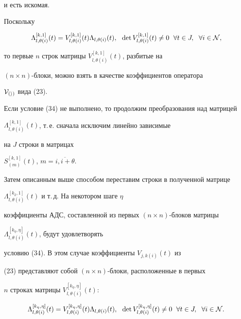 \begin{pf}
и есть искомая.





Поскольку


$$


\Lambda_{l,\theta(i)}^{[k,1]}(t)=V_{l,\theta (i)}^{[k,1]}(t)


\Lambda_{l,\theta(i)}(t), \ \ \det V_{l,\theta (i)}^{[k,1]}(t)


\ne 0 \ \; \forall t \in J, \ \; \forall i \in \cal N,


$$


то первые $n$ строк матрицы $V_{l,\theta (i)}^{[k,1]}(t)$, разбитые на


$(n \times n)$-блоки, можно взять в качестве коэффициентов оператора


$\cal V_{(i)}$ вида (23).





Если условие (34) не выполнено, то продолжим преобразования над матрицей


$\Lambda_{l,\theta(i)}^{[k,1]}(t)$, т.\,е. сначала исключим линейно зависимые


на $J$ строки в матрицах


$S_{(m)}^{[k,1]}(t)$, $m=\overline{i,i+\theta}$.


Затем описанным выше способом переставим строки в полученной матрице


$\Lambda_{l,\theta(i)}^{[k_2,1]}(t)$ и т.\,д. На некотором шаге $\eta$


коэффициенты АДС, составленной из первых $(n \times n)$-блоков матрицы


$\Lambda_{l,\theta(i)}^{[k_{\eta},\eta]}(t)$, будут удовлетворять


условию (34). В этом случае коэффициенты $V_{j,k(i)}(t)$ из 


(23) представляют собой $(n \times n)$-блоки, расположенные в первых 


$n$ строках матрицы $V_{l,\theta (i)}^{[k_{\eta},\eta]}(t)$:


$$ 


\Lambda_{l,\theta(i)}^{[k_{\eta},\eta]}(t)=V_{l,\theta (i)}^ 


{[k_{\eta},\eta]}(t)


\Lambda_{l,\theta(i)}(t), \ \ \det V_{l,\theta (i)}^{[k_{\eta},\eta]}(t)


\ne 0 \ \; \forall t \in J, \ \; \forall i \in \cal N.


$$






\end{pf}
